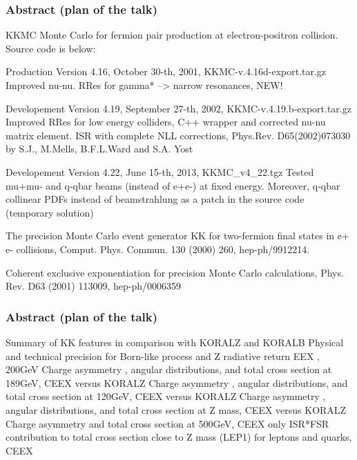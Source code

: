 \documentclass{beamer}
\begin{document}
\begin{frame}[fragile]
\frametitle{Abstract (plan of the talk)}
\footnotesize
KKMC Monte Carlo for fermion pair production at electron-positron collision. 
Source code is below:

Production Version 4.16, October 30-th, 2001,  
KKMC-v.4.16d-export.tar.gz Improved nu-nu. RRes for gamma* --> narrow resonances, NEW!

Developement Version 4.19, September  27-th, 2002,  
KKMC-v.4.19.b-export.tar.gz Improved  RRes for low energy colliders, 
C++ wrapper and corrected nu-nu matrix element. 
ISR with complete NLL corrections, Phys.Rev. D65(2002)073030 by S.J., M.Mells, B.F.L.Ward and S.A. Yost

Developement Version 4.22, June  15-th, 2013,  
KKMC\_v4\_22.tgz Tested mu+mu- and q-qbar beams (instead of e+e-) at fixed energy. 
Moreover, q-qbar collinear PDFs instead of beamstrahlung 
as a patch in the source code (temporary solution)

The precision Monte Carlo event generator KK for two-fermion final  states in e+ e- collisions,  
Comput. Phys. Commun. 130 (2000) 260, hep-ph/9912214.

Coherent exclusive exponentiation for precision Monte Carlo  calculations,  
Phys. Rev. D63 (2001) 113009, hep-ph/0006359

\end{frame}


\begin{frame}[fragile]
\frametitle{Abstract (plan of the talk)}
Summary of KK features in comparison with KORALZ   and KORALB
Physical and technical precision for Born-like process and Z radiative return  EEX ,  200GeV
Charge asymmetry , angular distributions, and  total cross section     at 189GeV,  CEEX versus KORALZ
Charge asymmetry , angular distributions, and  total cross section     at 120GeV,  CEEX versus KORALZ
Charge asymmetry , angular distributions, and  total cross section     at  Z mass,  CEEX versus KORALZ
Charge asymmetry and  total cross section     at 500GeV,  CEEX only
ISR*FSR  contribution to total cross section   close to Z mass (LEP1) for leptons and quarks,  CEEX

\end{frame}
\end{document}
